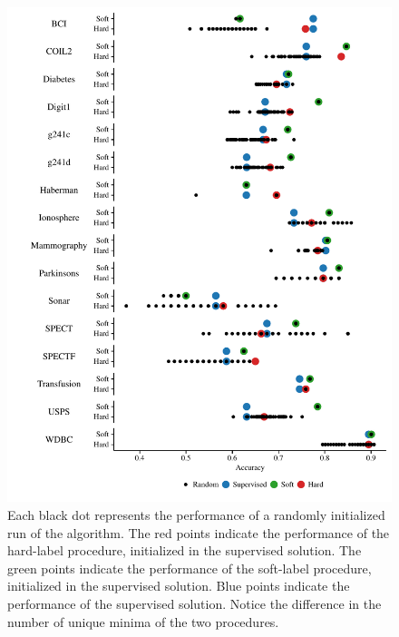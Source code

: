 \documentclass[conference,a4paper,10pt]{IEEEtran}\usepackage[]{graphicx}\usepackage[]{color}
\makeatletter
\def\maxwidth{ %
  \ifdim\Gin@nat@width>\linewidth
    \linewidth
  \else
    \Gin@nat@width
  \fi
}
\newenvironment{knitrout}{}{} %
\makeatother
\begin{document}
\begin{knitrout}
\color{fgcolor}\begin{figure}
\includegraphics[width=\maxwidth]{figure/localoptima-1} \caption[Each black dot represents the performance of a randomly initialized run of the algorithm]{Each black dot represents the performance of a randomly initialized run of the algorithm. The red points indicate the performance of the hard-label procedure, initialized in the supervised solution. The green points indicate the performance of the soft-label procedure, initialized in the supervised solution. Blue points indicate the performance of the supervised solution. Notice the difference in the number of unique minima of the two procedures.}\label{fig:localoptima}
\end{figure}


\end{knitrout}
\end{document}
